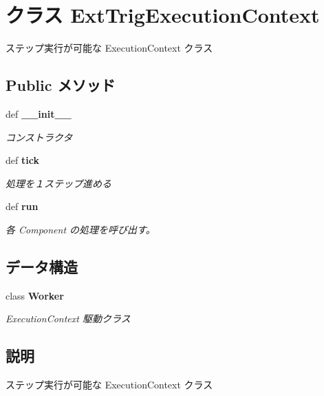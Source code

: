 \section{クラス ExtTrigExecutionContext}
\label{classsource__py_1_1_ext_trig_execution_context_1_1_ext_trig_execution_context}
ステップ実行が可能な ExecutionContext クラス  


\subsection*{Public メソッド}
\begin{CompactItemize}
\item 
def {\bf \_\-\_\-init\_\-\_\-}
\begin{CompactList}\small\item\em コンストラクタ \item\end{CompactList}\item 
def {\bf tick}
\begin{CompactList}\small\item\em 処理を１ステップ進める \item\end{CompactList}\item 
def {\bf run}
\begin{CompactList}\small\item\em 各 Component の処理を呼び出す。 \item\end{CompactList}\end{CompactItemize}
\subsection*{データ構造}
\begin{CompactItemize}
\item 
class {\bf Worker}
\begin{CompactList}\small\item\em ExecutionContext 駆動クラス \item\end{CompactList}\end{CompactItemize}


\subsection{説明}
ステップ実行が可能な ExecutionContext クラス 



